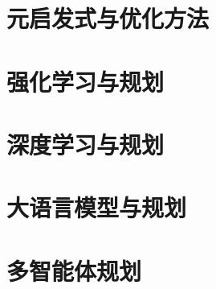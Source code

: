 \documentclass[a4paper,12pt,openany]{ctexbook}
\theoremstyle{definition}
\theoremstyle{plain}
\begin{document}





\part{元启发式与优化方法}



\part{强化学习与规划}




\part{深度学习与规划}



\part{大语言模型与规划}




\part{多智能体规划}



\appendix

\end{document}

